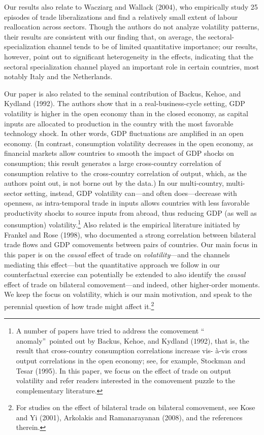 \documentclass[12pt]{article}
\begin{document}
Our results also relate to Wacziarg and Wallack (2004), who empirically
study 25 episodes of trade liberalizations and find a relatively small
extent of labour reallocation across sectors. Though the authors do not
analyze volatility patterns, their results are consistent with our finding
that, on average, the sectoral-specialization channel tends to be of limited
quantitative importance; our results, however, point out to significant
heterogeneity in the effects, indicating that the sectoral specialization
channel played an important role in certain countries, most notably Italy
and the Netherlands.

Our paper is also related to the seminal contribution of Backus, Kehoe, and
Kydland (1992). The authors show that in a real-business-cycle setting, GDP
volatility is higher in the open economy than in the closed economy, as
capital inputs are allocated to production in the country with the most
favorable technology shock. In other words, GDP fluctuations are amplified
in an open economy. (In contrast, consumption volatility decreases in the
open economy, as financial markets allow countries to smooth the impact of
GDP shocks on consumption; this result generates a large cross-country
correlation of consumption relative to\ the cross-country correlation of
output, which, as the authors point out, is not borne out by the data.) In
our multi-country, multi-sector setting, instead, GDP volatility can---and
often does---decrease with openness, as intra-temporal trade in inputs
allows countries with less favorable productivity shocks to source inputs
from abroad, thus reducing GDP (as well as consumption) volatility.\footnote{%
A number of papers have tried to address the comovement \textquotedblleft
anomaly\textquotedblright\ pointed out by Backus, Kehoe, and Kydland (1992),
that is, the result that cross-country consumption correlations increase vis-%
\`{a}-vis cross output correlations in the open economy; see, for example,
Stockman and Tesar (1995). In this paper, we focus on the effect of trade on
output volatility and refer readers interested in the comovement puzzle to
the complementary literature.} Also related is the empirical literature
initiated by Frankel and Rose (1998), who documented a strong correlation
between bilateral trade flows and GDP comovements between pairs of
countries. Our main focus in this paper is on the \textit{causal} effect of
trade on \textit{volatility}---and the channels mediating this effect---but
the quantitative approach we follow in our counterfactual exercise can
potentially be extended to also identify the \textit{causal }effect of trade
on bilateral comovement---and indeed, other higher-order moments. We keep
the focus on volatility, which is our main motivation, and speak to the
perennial question of how trade might affect it.\footnote{%
For studies on the effect of bilateral trade on bilateral comovement, see
Kose and Yi (2001), Arkolakis and Ramanarayanan (2008), and the references
therein.}
\end{document}
